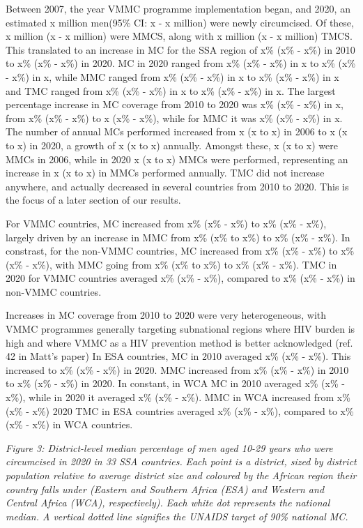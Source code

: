 \documentclass[a4paper, 12pt]{article}
\begin{document}
Between 2007, the year VMMC programme implementation began, and 2020, an estimated x million men(95\% CI: x - x million) were newly circumcised. 
Of these, x million (x - x million) were MMCS, along with x million (x - x million) TMCS. 
This translated to an increase in MC for the SSA region of x\% (x\% - x\%) in 2010 to x\% (x\% - x\%) in  2020. 
MC in 2020 ranged from x\% (x\% - x\%) in x to x\% (x\% - x\%) in x, while MMC ranged from x\% (x\% - x\%) in x to x\% (x\% - x\%) in x and TMC ranged from x\% (x\% - x\%) in x to x\% (x\% - x\%) in x. 
The largest percentage increase in MC coverage from 2010 to 2020 was x\% (x\% - x\%) in x, from x\% (x\% - x\%) to x (x\% - x\%), while for MMC it was x\% (x\% - x\%) in x. 
The number of annual MCs performed increased from x (x to x) in 2006 to x (x to x) in 2020, a growth of x (x to x) annually. 
Amongst these, x (x to x) were MMCs in 2006, while in 2020 x (x to x) MMCs were performed, representing an increase in x (x to x) in MMCs performed annually. 
TMC did not increase anywhere,  and actually decreased in several countries from 2010 to 2020. 
This is the focus of a later section of our results. 

For VMMC countries, MC increased from x\% (x\% - x\%) to x\% (x\% - x\%), largely driven by an increase in MMC from x\% (x\% to x\%)  to x\% (x\% - x\%). 
In constrast, for the non-VMMC countries, MC increased from x\% (x\% - x\%) to x\% (x\% - x\%), with MMC going from x\% (x\% to x\%)  to x\% (x\% - x\%). 
TMC in 2020 for VMMC countries averaged x\% (x\% - x\%), compared to x\% (x\% - x\%) in non-VMMC countries. 

Increases in MC coverage from 2010 to 2020 were very heterogeneous, with VMMC programmes generally targeting subnational regions where HIV burden is high and where VMMC as a HIV prevention method is better acknowledged (ref. 42 in Matt's paper)
In ESA countries, MC in 2010 averaged x\% (x\% - x\%). 
This increased to x\% (x\% - x\%) in 2020. MMC increased from x\% (x\% - x\%) in 2010 to x\% (x\% - x\%) in 2020. 
In constant, in WCA MC in 2010 averaged x\% (x\% - x\%), while in 2020 it averaged x\% (x\% - x\%).
MMC in WCA increased from x\% (x\% - x\%)
2020 TMC in ESA countries averaged x\% (x\% - x\%), compared to x\% (x\% - x\%) in WCA countries. 

\emph{Figure 3: District-level median percentage of men aged 10-29 years who were circumcised in 2020 in 33 SSA countries.}
\emph{Each point is a district, sized by district population relative to average district size and coloured by the African region their country falls under (Eastern and Southern Africa (ESA) and Western and Central Africa (WCA), respectively).}
\emph{Each white dot represents the national median. A vertical dotted line signifies the UNAIDS target of 90\% national MC.}
\end{document}
